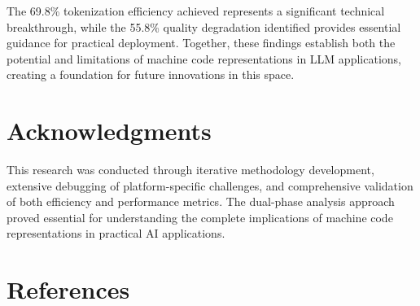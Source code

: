 \documentclass[11pt,a4paper]{article}
\begin{document}
The 69.8\% tokenization efficiency achieved represents a significant technical breakthrough, while the 55.8\% quality degradation identified provides essential guidance for practical deployment. Together, these findings establish both the potential and limitations of machine code representations in LLM applications, creating a foundation for future innovations in this space.

\section{Acknowledgments}
This research was conducted through iterative methodology development, extensive debugging of platform-specific challenges, and comprehensive validation of both efficiency and performance metrics. The dual-phase analysis approach proved essential for understanding the complete implications of machine code representations in practical AI applications.

\section{References}
\end{document}
